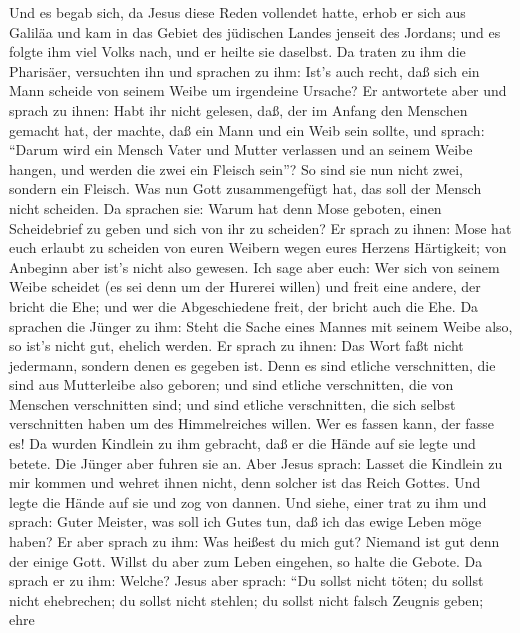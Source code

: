  Und es begab sich, da Jesus diese Reden vollendet hatte,
erhob er sich aus Galiläa und kam in das Gebiet des jüdischen Landes
jenseit des Jordans;  und es folgte ihm viel Volks nach, und
er heilte sie daselbst.  Da traten zu ihm die Pharisäer,
versuchten ihn und sprachen zu ihm: Ist's auch recht, daß sich ein Mann
scheide von seinem Weibe um irgendeine Ursache?  Er
antwortete aber und sprach zu ihnen: Habt ihr nicht gelesen, daß, der im
Anfang den Menschen gemacht hat, der machte, daß ein Mann und ein Weib
sein sollte,  und sprach: ``Darum wird ein Mensch Vater und
Mutter verlassen und an seinem Weibe hangen, und werden die zwei ein
Fleisch sein''?  So sind sie nun nicht zwei, sondern ein
Fleisch. Was nun Gott zusammengefügt hat, das soll der Mensch nicht
scheiden.  Da sprachen sie: Warum hat denn Mose geboten,
einen Scheidebrief zu geben und sich von ihr zu scheiden? 
Er sprach zu ihnen: Mose hat euch erlaubt zu scheiden von euren Weibern
wegen eures Herzens Härtigkeit; von Anbeginn aber ist's nicht also
gewesen.  Ich sage aber euch: Wer sich von seinem Weibe
scheidet (es sei denn um der Hurerei willen) und freit eine andere, der
bricht die Ehe; und wer die Abgeschiedene freit, der bricht auch die
Ehe.  Da sprachen die Jünger zu ihm: Steht die Sache eines
Mannes mit seinem Weibe also, so ist's nicht gut, ehelich werden.
 Er sprach zu ihnen: Das Wort faßt nicht jedermann, sondern
denen es gegeben ist.  Denn es sind etliche verschnitten,
die sind aus Mutterleibe also geboren; und sind etliche verschnitten,
die von Menschen verschnitten sind; und sind etliche verschnitten, die
sich selbst verschnitten haben um des Himmelreiches willen. Wer es
fassen kann, der fasse es!  Da wurden Kindlein zu ihm
gebracht, daß er die Hände auf sie legte und betete. Die Jünger aber
fuhren sie an.  Aber Jesus sprach: Lasset die Kindlein zu
mir kommen und wehret ihnen nicht, denn solcher ist das Reich Gottes.
 Und legte die Hände auf sie und zog von dannen.
 Und siehe, einer trat zu ihm und sprach: Guter Meister,
was soll ich Gutes tun, daß ich das ewige Leben möge haben?
 Er aber sprach zu ihm: Was heißest du mich gut? Niemand
ist gut denn der einige Gott. Willst du aber zum Leben eingehen, so
halte die Gebote.  Da sprach er zu ihm: Welche? Jesus aber
sprach: ``Du sollst nicht töten; du sollst nicht ehebrechen; du sollst
nicht stehlen; du sollst nicht falsch Zeugnis geben;  ehre
